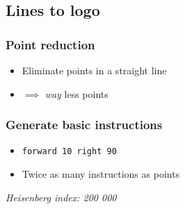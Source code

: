 \subsection{Lines to logo}
\begin{frame}
\frametitle{Point reduction}
  \begin{itemize}
    \item Eliminate points in a straight line
    \item $\implies$ \emph{way} less points
  \end{itemize}
\end{frame}

\begin{frame}
\frametitle{Generate basic instructions}
  \begin{itemize}
    \item \texttt{forward 10 right 90}
    \item Twice as many instructions as points
  \end{itemize}
  \emph{Heisenberg index: 200 000}
\end{frame}

